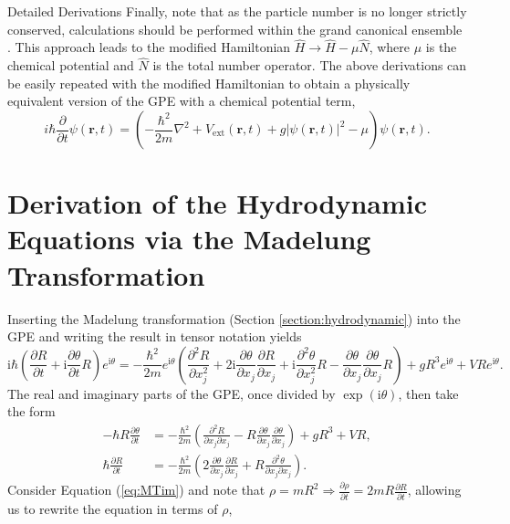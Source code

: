 \begin{chapter}{Detailed Derivations\label{app:App2}}
Finally, note that as the particle number is no longer strictly conserved, calculations should be performed within the grand canonical ensemble \cite{huang1987statistical}. This approach leads to the modified Hamiltonian $\hat{H} \rightarrow \hat{H} -\mu\hat{N}$, where $\mu$ is the chemical potential and $\hat{N}$ is the total number operator. The above derivations can be easily repeated with the modified Hamiltonian to obtain a physically equivalent version of the GPE with a chemical potential term,
\begin{equation}
i \hbar\frac{\partial}{\partial t}\psi(\mathbf{r},t) = \left ( -\frac{\hbar^2}{2m}\nabla^2+V_{\mathrm{ext}}(\mathbf{r},t) + g|\psi(\mathbf{r},t)|^2 - \mu \right ) \psi(\mathbf{r},t).
\end{equation}

\section{\label{appsection:madtrans} Derivation of the Hydrodynamic Equations via the Madelung Transformation}
Inserting the Madelung transformation (Section \ref{section:hydrodynamic}) into the GPE and writing the result in tensor notation yields
\begin{equation*}
  \mathrm{i}\hbar\left( \frac{\partial R}{\partial t} + \mathrm{i}\frac{\partial \theta}{\partial t} R \right)e^{\mathrm{i}\theta} =
  -\frac{\hbar^2}{2m}e^{\mathrm{i}\theta}\left( \frac{\partial^2 R}{\partial x_j^2} + 2\mathrm{i}\frac{\partial \theta}{\partial x_j}\frac{\partial R}{\partial x_j}+
  \mathrm{i}\frac{\partial^2 \theta}{\partial x_j^2}R -  \frac{\partial \theta}{\partial x_j}\frac{\partial \theta}{\partial x_j} R  \right) + gR^3e^{\mathrm{i}\theta} + VRe^{\mathrm{i}\theta}.
\end{equation*}
The real and imaginary parts of the GPE, once divided by $\exp (\mathrm{i}\theta)$, then take the form
\begin{align}
  -\hbar R \frac{\partial \theta}{\partial t} &= -\frac{\hbar^2}{2m}\left( \frac{\partial^2 R}{\partial x_j \partial x_j} - R \frac{\partial \theta}{\partial x_j}\frac{\partial \theta}{\partial x_j}  \right) + gR^3 + VR, \label{eq:MTre}\\
  \hbar \frac{\partial R}{\partial t} &= -\frac{\hbar^2}{2m}\left( 2\frac{\partial \theta}{\partial x_j}\frac{\partial R}{\partial x_j} + R \frac{\partial^2 \theta}{\partial x_j \partial x_j} \right).
  \label{eq:MTim}
\end{align}
Consider Equation (\ref{eq:MTim}) and note that $\rho = mR^2 \Rightarrow \frac{\partial \rho}{\partial t} = 2mR\frac{\partial R}{\partial t}$, allowing us to rewrite the equation in terms of $\rho$,

\end{chapter}
